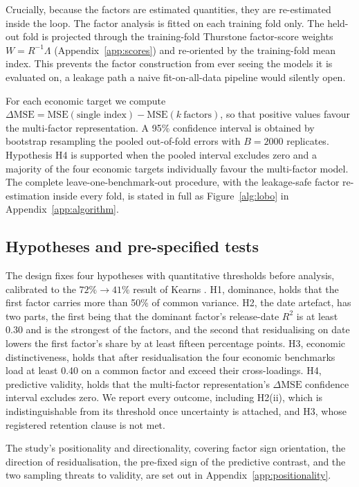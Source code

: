 Crucially, because the factors are estimated quantities, they are re-estimated inside the loop. The factor analysis is fitted on each training fold only. The held-out fold is projected through the training-fold Thurstone factor-score weights $W = R^{-1}\Lambda$ (Appendix~\ref{app:scores}) and re-oriented by the
training-fold mean index. This prevents the factor construction from ever seeing the models it is
evaluated on, a leakage path a naive fit-on-all-data pipeline would silently open.

For each economic target we compute $\Delta\mathrm{MSE} = \mathrm{MSE}(\text{single index}) -
\mathrm{MSE}(k\ \text{factors})$, so that positive values favour the multi-factor representation. A 95\%
confidence interval is obtained by bootstrap resampling the pooled out-of-fold errors \cite{efron1993}
with $B=2000$ replicates. Hypothesis H4 is supported when the pooled interval excludes zero and a
majority of the four economic targets individually favour the multi-factor model. The complete
leave-one-benchmark-out procedure, with the leakage-safe factor re-estimation inside every fold, is
stated in full as Figure~\ref{alg:lobo} in Appendix~\ref{app:algorithm}.

\subsection{Hypotheses and pre-specified tests}\label{sec:hypotheses}
The design fixes four hypotheses with quantitative thresholds before analysis, calibrated to the
$72\%\rightarrow41\%$ result of Kearns \cite{kearns2026}. H1, dominance, holds that the first factor
carries more than 50\% of common variance. H2, the date artefact, has two parts, the first being that
the dominant factor's release-date $R^2$ is at least 0.30 and is the strongest of the factors, and the
second that residualising on date lowers the first factor's share by at least fifteen percentage points.
H3, economic distinctiveness, holds that after residualisation the four economic benchmarks load at
least 0.40 on a common factor and exceed their cross-loadings. H4, predictive validity, holds that the
multi-factor representation's $\Delta\mathrm{MSE}$ confidence interval excludes zero. We report every
outcome, including H2(ii), which is indistinguishable from its threshold once uncertainty is attached,
and H3, whose registered retention clause is not met.

The study's positionality and directionality, covering factor sign orientation, the direction of residualisation, the pre-fixed sign of the predictive contrast, and the two sampling threats to validity, are set out in Appendix~\ref{app:positionality}.

